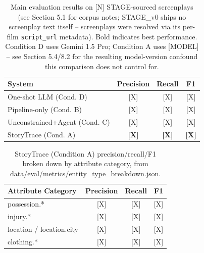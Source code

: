 
\begin{table}[h]
\centering
\begin{tabular}{lccc}
\hline
System & Precision & Recall & F1 \\
\hline
One-shot LLM (Cond. D) & [X] & [X] & [X] \\
Pipeline-only (Cond. B) & [X] & [X] & [X] \\
Unconstrained+Agent (Cond. C) & [X] & [X] & [X] \\
StoryTrace (Cond. A) & \textbf{[X]} & \textbf{[X]} & \textbf{[X]} \\
\hline
\end{tabular}
\caption{Main evaluation results on [N] STAGE-sourced screenplays (see
Section 5.1 for corpus notes; STAGE\_v0 ships no screenplay text itself --
screenplays were resolved via its per-film \texttt{script\_url} metadata).
Bold indicates best performance. Condition D uses Gemini 1.5 Pro; Condition
A uses [MODEL] -- see Section 5.4/8.2 for the resulting model-version
confound this comparison does not control for.}
\label{tab:main-results}
\end{table}

\begin{table}[h]
\centering
\begin{tabular}{lccc}
\hline
Attribute Category & Precision & Recall & F1 \\
\hline
possession.* & [X] & [X] & [X] \\
injury.* & [X] & [X] & [X] \\
location / location.city & [X] & [X] & [X] \\
clothing.* & [X] & [X] & [X] \\
\hline
\end{tabular}
\caption{StoryTrace (Condition A) precision/recall/F1 broken down by
attribute category, from data/eval/metrics/entity\_type\_breakdown.json.}
\label{tab:entity-breakdown}
\end{table}

